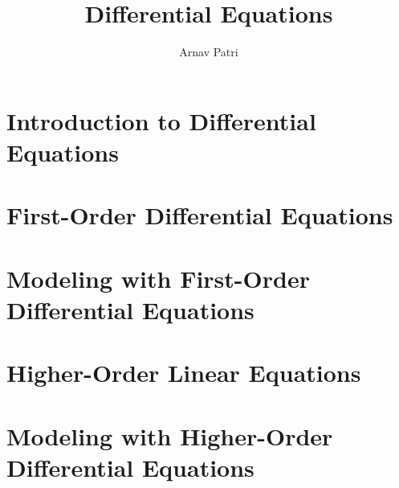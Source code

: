 \documentclass[12pt, A4]{report}
\title{Differential Equations}
\author{Arnav Patri}
\begin{document}
	\maketitle
	\tableofcontents
	\chapter{Introduction to Differential Equations}
		
	\chapter{First-Order Differential Equations}
		
	\chapter{Modeling with First-Order Differential Equations}
		
	\chapter{Higher-Order Linear Equations}
		
	\chapter{Modeling with Higher-Order Differential Equations}
		
\end{document}
